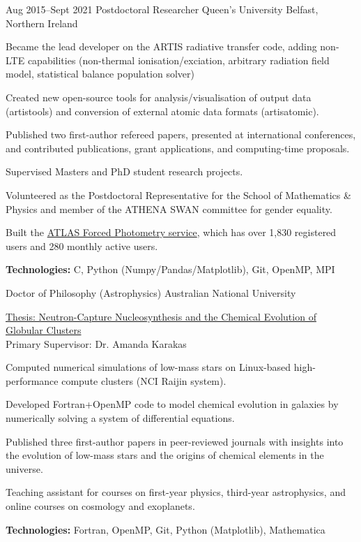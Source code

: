 \documentclass[11pt]{article} %
\begin{document}
\job
{Aug 2015--}{Sept 2021}
{Postdoctoral Researcher}
{}
{Queen's University Belfast, Northern Ireland}
{\begin{itemize-noindent}
\item{Became the lead developer on the ARTIS radiative transfer code, adding non-LTE capabilities (non-thermal ionisation/exciation, arbitrary radiation field model, statistical balance population solver)}
\item{Created new open-source tools for analysis/visualisation of output data (artistools) and conversion of external atomic data formats (artisatomic).}
\item{Published two first-author refereed papers, presented at international conferences, and contributed publications, grant applications, and computing-time proposals.}
\item{Supervised Masters and PhD student research projects.}
\item{Volunteered as the Postdoctoral Representative for the School of Mathematics \& Physics and member of the ATHENA SWAN committee for gender equality.}
\item{Built the \href{https://fallingstar-data.com/forcedphot/}{ATLAS Forced Photometry service}, which has over 1,830 registered users and 280 monthly active users.}
\end{itemize-noindent}
\textbf{Technologies:} C, Python (Numpy/Pandas/Matplotlib), Git, OpenMP, MPI
}

{Doctor of Philosophy (Astrophysics)}
{}{Australian National University}
{
\href{https://openresearch-repository.anu.edu.au/handle/1885/16507}{Thesis: Neutron-Capture Nucleosynthesis and the Chemical Evolution of Globular Clusters}\\
Primary Supervisor: Dr. Amanda Karakas
\begin{itemize-noindent}
  \item Computed numerical simulations of low-mass stars on Linux-based high-performance compute clusters (NCI Raijin system).
  \item Developed Fortran+OpenMP code to model chemical evolution in galaxies by numerically solving a system of differential equations.
  \item Published three first-author papers in peer-reviewed journals with insights into the evolution of low-mass stars and the origins of chemical elements in the universe.
  \item Teaching assistant for courses on first-year physics, third-year astrophysics, and online courses on cosmology and exoplanets.
\end{itemize-noindent}
\textbf{Technologies:} Fortran, OpenMP, Git, Python (Matplotlib), Mathematica
}
\end{document}
